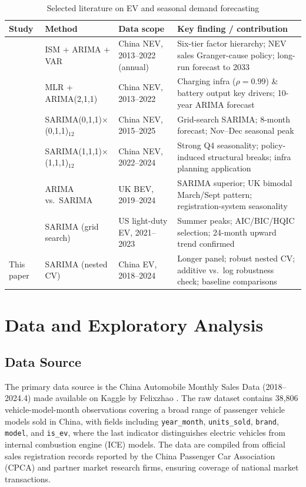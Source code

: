 \documentclass[12pt]{article}
\begin{document}
\begin{table}[H]
\centering
\small
\caption{Selected literature on EV and seasonal demand forecasting}
\label{tab:lit}
\begin{tabular}{p{2.0cm} p{4.0cm} p{3.0cm} p{5.0cm}}
\toprule
Study & Method & Data scope & Key finding / contribution \\
\midrule
\citet{ge2024} & ISM + ARIMA + VAR & China NEV, 2013--2022 (annual) & Six-tier factor hierarchy; NEV sales Granger-cause policy; long-run forecast to 2033 \\[4pt]
\citet{yang2024} & MLR + ARIMA(2,1,1) & China NEV, 2013--2022 & Charging infra ($\rho{=}0.99$) \& battery output key drivers; 10-year ARIMA forecast \\[4pt]
\citet{liang2025} & SARIMA(0,1,1)$\times$(0,1,1)$_{12}$ & China NEV, 2015--2025 & Grid-search SARIMA; 8-month forecast; Nov--Dec seasonal peak \\[4pt]
\citet{chen2025} & SARIMA(1,1,1)$\times$(1,1,1)$_{12}$ & China NEV, 2022--2024 & Strong Q4 seasonality; policy-induced structural breaks; infra planning application \\[4pt]
\citet{lu2024} & ARIMA vs.\ SARIMA & UK BEV, 2019--2024 & SARIMA superior; UK bimodal March/Sept pattern; registration-system seasonality \\[4pt]
\citet{cetin2024} & SARIMA (grid search) & US light-duty EV, 2021--2023 & Summer peaks; AIC/BIC/HQIC selection; 24-month upward trend confirmed \\[4pt]
This paper & SARIMA (nested CV) & China EV, 2018--2024 & Longer panel; robust nested CV; additive vs.\ log robustness check; baseline comparisons \\
\bottomrule
\end{tabular}
\end{table}

\section{Data and Exploratory Analysis}
\label{sec:data}

\subsection{Data Source}

The primary data source is the China Automobile Monthly Sales Data (2018--2024.4) made available on Kaggle by Felixzhao \citep{felixzhao2024}. The raw dataset contains 38,806 vehicle-model-month observations covering a broad range of passenger vehicle models sold in China, with fields including \texttt{year\_month}, \texttt{units\_sold}, \texttt{brand}, \texttt{model}, and \texttt{is\_ev}, where the last indicator distinguishes electric vehicles from internal combustion engine (ICE) models. The data are compiled from official sales registration records reported by the China Passenger Car Association (CPCA) and partner market research firms, ensuring coverage of national market transactions.
\end{document}
